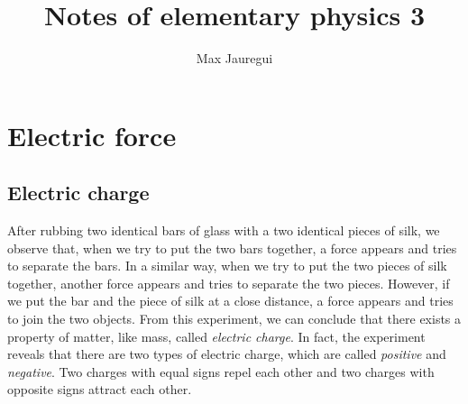 \documentclass[12pt,a4paper]{article}
\title{Notes of elementary physics 3}
\author{Max Jauregui}
\theoremstyle{definition}
\begin{document}
\maketitle

\section{Electric force}

\subsection{Electric charge}

After rubbing two identical bars of glass with a two identical pieces
of silk, we observe that, when we try to put the two bars together, a
force appears and tries to separate the bars. In a similar way, when
we try to put the two pieces of silk together, another force appears
and tries to separate the two pieces. However, if we put the bar and
the piece of silk at a close distance, a force appears and tries to
join the two objects. From this experiment, we can conclude that there
exists a property of matter, like mass, called \emph{electric
  charge}. In fact, the experiment reveals that there are two types of
electric charge, which are called \emph{positive} and
\emph{negative}. Two charges with equal signs repel each other and two
charges with opposite signs attract each other.
\end{document}
